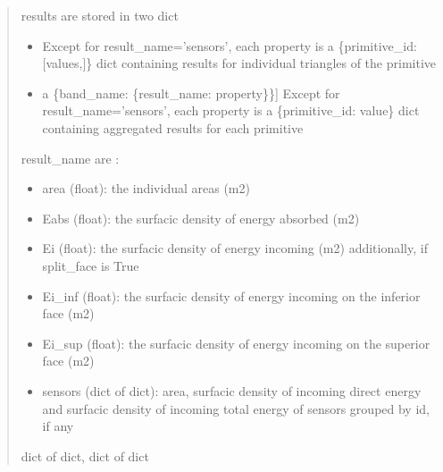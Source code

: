 \documentclass[letterpaper,10pt,english]{sphinxmanual}
\begin{document}
\begin{fulllineitems}
\begin{quote}
\begin{description}
\begin{itemize}
\end{itemize}

\sphinxAtStartPar

\sphinxAtStartPar
results are stored in two dict
\begin{itemize}
\item {} \begin{description}
\sphinxAtStartPar
Except for result\_name=’sensors’, each property is a \{primitive\_id: {[}values,{]}\} dict containing results
for individual triangles of the primitive

\end{description}

\item {} \begin{description}
\sphinxlineitem{aggregated (dict of dict)}{[}a \{band\_name: \{result\_name: property\}\}{]}
\sphinxAtStartPar
Except for result\_name=’sensors’, each property is a \{primitive\_id: value\} dict containing aggregated
results for each primitive

\end{description}

\end{itemize}

\sphinxAtStartPar
result\_name are :
\begin{itemize}
\item {} 
\sphinxAtStartPar
area (float): the individual areas (m2)

\item {} 
\sphinxAtStartPar
Eabs (float): the surfacic density of energy absorbed (m\sphinxhyphen{}2)

\item {} 
\sphinxAtStartPar
Ei (float): the surfacic density of energy incoming  (m\sphinxhyphen{}2) additionally, if split\_face is True

\item {} 
\sphinxAtStartPar
Ei\_inf (float): the surfacic density of energy incoming on the inferior face (m\sphinxhyphen{}2)

\item {} 
\sphinxAtStartPar
Ei\_sup (float): the surfacic density of energy incoming on the superior face (m\sphinxhyphen{}2)

\item {} 
\sphinxAtStartPar
sensors (dict of dict): area, surfacic density of incoming direct energy and surfacic density of incoming total energy of sensors grouped by id, if any

\end{itemize}


\sphinxAtStartPar
dict of dict, dict of dict

\end{description}\end{quote}

\end{fulllineitems}
\end{document}

